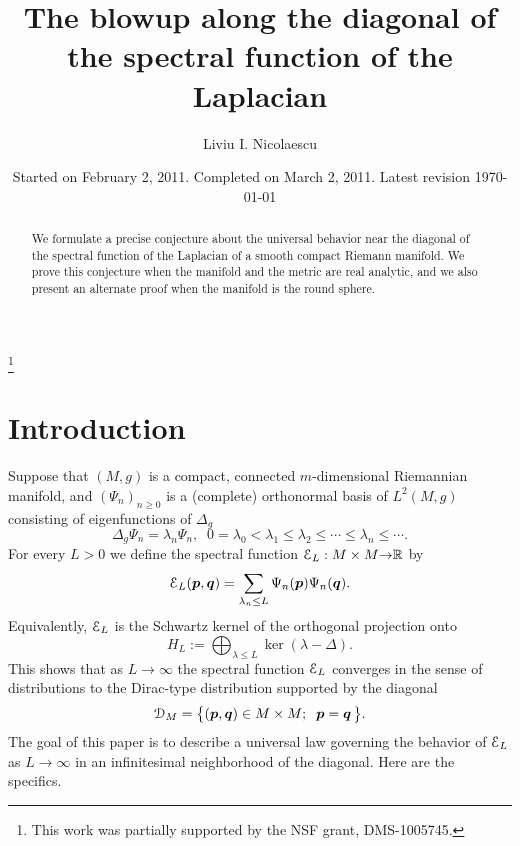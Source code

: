 \documentclass[reqno, 11pt]{amsart}
\theoremstyle{definition}
\numberwithin{equation}{section}
\begin{document}
\title[The blowup of the spectral function]{The blowup along the diagonal of the spectral function  of the Laplacian} 

\date{Started on February 2, 2011. Completed on March 2, 2011. Latest revision \today}

\author{Liviu I. Nicolaescu}
\thanks{This work was partially supported by the NSF grant, DMS-1005745.}

\address{Department of Mathematics, University of Notre Dame, Notre Dame, IN 46556-4618.}



\begin{abstract}  We formulate  a precise conjecture about  the universal behavior  near the diagonal of the spectral function of the Laplacian    of a smooth compact Riemann manifold. We prove  this conjecture   when  the manifold and the metric are real analytic, and we also present an alternate  proof      when  the manifold is the round sphere.

\end{abstract}

\maketitle

\tableofcontents

\section{Introduction}
\setcounter{equation}{0}

Suppose that $(M,g)$ is a compact, connected $m$-dimensional Riemannian manifold,  and $(\Psi_n)_{n\geq 0}$ is a (complete) orthonormal basis of $L^2(M,g)$ consisting of eigenfunctions of $\Delta_g$
\[
\Delta_g \Psi_n=\lambda_n\Psi_n,\;\; 0=\lambda_0<\lambda_1\leq \lambda_2\leq \cdots\leq \lambda _n\leq \cdots.
\]
For every $L>0$ we define the spectral function  ${\EuScript{E}}_L:M\times M{\rightarrow} {{\mathbb R}}$ by
\[
{\EuScript{E}}_L({{\boldsymbol{p}}},{{\boldsymbol{q}}})=\sum_{\lambda_n\leq L} \Psi_n({{\boldsymbol{p}}})\Psi_n({{\boldsymbol{q}}}).
\]
Equivalently, ${\EuScript{E}}_L$ is the Schwartz kernel of the orthogonal projection onto
\[
H_L:=\bigoplus_{\lambda\leq L} \ker(\lambda-\Delta).
\]
This shows that as $L{\rightarrow} \infty$   the spectral function ${\EuScript{E}}_L$ converges in the sense of distributions to the Dirac-type distribution supported by the diagonal
\[
{\EuScript{D}}_M=\bigl\{ ({{\boldsymbol{p}}},{{\boldsymbol{q}}})\in M\times M;\;\;{{\boldsymbol{p}}}={{\boldsymbol{q}}}\,\bigr\}.
\]
The goal of this paper is to  describe  a universal law governing  the behavior  of ${\EuScript{E}}_L$  as $L{\rightarrow} \infty$ in an infinitesimal  neighborhood of the diagonal. Here are the specifics.
\end{document}
